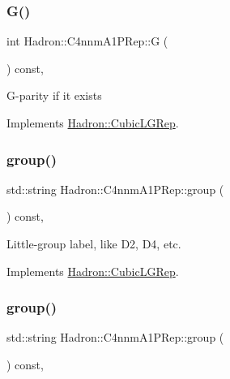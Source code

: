 \subsubsection{\texorpdfstring{G()}{G()}\hspace{0.1cm}{\footnotesize\ttfamily [2/2]}}
{\footnotesize\ttfamily int Hadron\+::\+C4nnm\+A1\+P\+Rep\+::G (\begin{DoxyParamCaption}{ }\end{DoxyParamCaption}) const\hspace{0.3cm}{\ttfamily [inline]}, {\ttfamily [virtual]}}

G-\/parity if it exists 

Implements \mbox{\hyperlink{structHadron_1_1CubicLGRep_ace26f7b2d55e3a668a14cb9026da5231}{Hadron\+::\+Cubic\+L\+G\+Rep}}.

\mbox{\label{structHadron_1_1C4nnmA1PRep_aca4b417019aecb9f64613cca8fb4a152}} 
\subsubsection{\texorpdfstring{group()}{group()}\hspace{0.1cm}{\footnotesize\ttfamily [1/2]}}
{\footnotesize\ttfamily std\+::string Hadron\+::\+C4nnm\+A1\+P\+Rep\+::group (\begin{DoxyParamCaption}{ }\end{DoxyParamCaption}) const\hspace{0.3cm}{\ttfamily [inline]}, {\ttfamily [virtual]}}

Little-\/group label, like D2, D4, etc. 

Implements \mbox{\hyperlink{structHadron_1_1CubicLGRep_a9bdb14b519a611d21379ed96a3a9eb41}{Hadron\+::\+Cubic\+L\+G\+Rep}}.

\mbox{\label{structHadron_1_1C4nnmA1PRep_aca4b417019aecb9f64613cca8fb4a152}} 
\subsubsection{\texorpdfstring{group()}{group()}\hspace{0.1cm}{\footnotesize\ttfamily [2/2]}}
{\footnotesize\ttfamily std\+::string Hadron\+::\+C4nnm\+A1\+P\+Rep\+::group (\begin{DoxyParamCaption}{ }\end{DoxyParamCaption}) const\hspace{0.3cm}{\ttfamily [inline]}, {\ttfamily [virtual]}}

